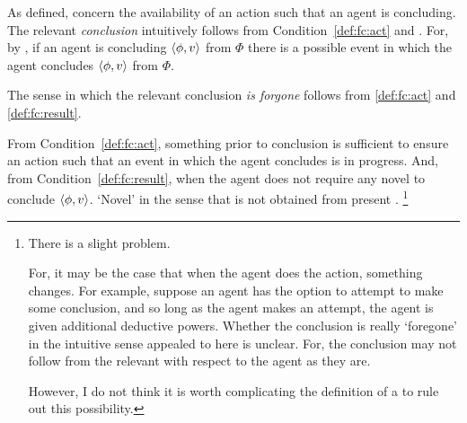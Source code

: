 \begin{note}
  As defined,  concern the availability of an action such that an agent is concluding.
  The relevant \emph{conclusion} intuitively follows from Condition~\ref{def:fc:act} and \assuPP{}.
  For, by \assuPP{}, if an agent is concluding \(\langle\phi, v\rangle\) from \(\Phi\) there is a possible event in which the agent concludes \(\langle\phi, v\rangle\) from \(\Phi\).

  The sense in which the relevant conclusion \emph{is forgone} follows from \ref{def:fc:act} and \ref{def:fc:result}.

  From Condition~\ref{def:fc:act}, something prior to conclusion is sufficient to ensure an action such that an event in which the agent concludes is in progress.
  And, from Condition~\ref{def:fc:result}, when the agent does not require any novel \evals{} to conclude \(\langle\phi, v\rangle\).
  `Novel' in the sense that \eval{} is not obtained from present .%
  \footnote{
    There is a slight problem.

    For, it may be the case that when the agent does the action, something changes.
    For example, suppose an agent has the option to attempt to make some conclusion, and so long as the agent makes an attempt, the agent is given additional deductive powers.
    Whether the conclusion is really `foregone' in the intuitive sense appealed to here is unclear.
    For, the conclusion may not follow from the relevant \pool{} with respect to the agent as they are.

    However, I do not think it is worth complicating the definition of a \fc{} to rule out this possibility.
  }
\end{note}

